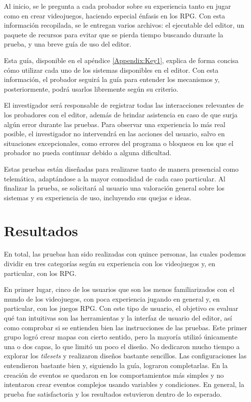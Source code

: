 \smallskip

Al inicio, se le pregunta a cada probador sobre su experiencia tanto en jugar como en crear videojuegos, haciendo especial énfasis en los RPG. Con esta información recopilada, se le entregan varios archivos: el ejecutable del editor, un paquete de recursos para evitar que se pierda tiempo buscando durante la prueba, y una breve guía de uso del editor.

\smallskip

Esta guía, disponible en el apéndice \ref{Appendix:Key1}, explica de forma concisa cómo utilizar cada uno de los sistemas disponibles en el editor. Con esta información, el probador seguirá la guía para entender los mecanismos y, posteriormente, podrá usarlos libremente según su criterio.

\medskip

El investigador será responsable de registrar todas las interacciones relevantes de los probadores con el editor, además de brindar asistencia en caso de que surja algún error durante las pruebas. Para observar una experiencia lo más real posible, el investigador no intervendrá en las acciones del usuario, salvo en situaciones excepcionales, como errores del programa o bloqueos en los que el probador no pueda continuar debido a alguna dificultad.

\smallskip

Estas pruebas están diseñadas para realizarse tanto de manera presencial como telemática, adaptándose a la mayor comodidad de cada caso particular. Al finalizar la prueba, se solicitará al usuario una valoración general sobre los sistemas y su experiencia de uso, incluyendo sus quejas e ideas.

\section{Resultados}

En total, las pruebas han sido realizadas con quince personas, las cuales podemos dividir en tres categorías según su experiencia con los videojuegos y, en particular, con los RPG.

\smallskip 

En primer lugar, cinco de los usuarios que son los menos familiarizados con el mundo de los videojuegos, con poca experiencia jugando en general y, en particular, con los juegos RPG. Con este tipo de usuario, el objetivo es evaluar qué tan intuitivas son las herramientas y la interfaz de usuario del editor, así como comprobar si se entienden bien las instrucciones de las pruebas. Este primer grupo logró crear mapas con cierto sentido, pero la mayoría utilizó únicamente una o dos capas, lo que limitó un poco el diseño. No dedicaron mucho tiempo a explorar los \textit{tilesets} y realizaron diseños bastante sencillos. Las configuraciones las entendieron bastante bien y, siguiendo la guía, lograron completarlas. En la creación de eventos se quedaron en los comportamientos más simples y no intentaron crear eventos complejos usando variables y condiciones. En general, la prueba fue satisfactoria y los resultados estuvieron dentro de lo esperado.

